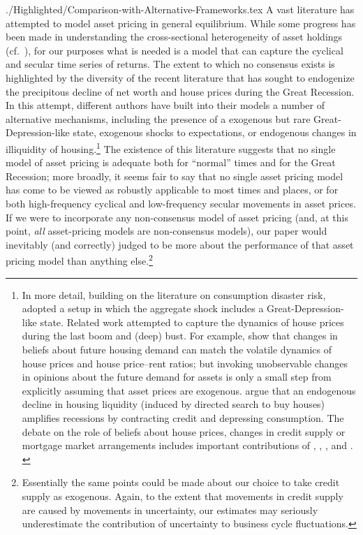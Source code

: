 \documentclass[titlepage]{\econtex}
\begin{document}
\begin{verbatimwrite}{./Highlighted/Comparison-with-Alternative-Frameworks.tex}
A vast literature has attempted to model asset pricing in general equilibrium.  While some progress has been made in understanding the cross-sectional heterogeneity of asset holdings (cf.\ \cite{gmAssetPricing}), for our purposes what is needed is a model that can capture the cyclical and secular time series of returns.  The extent to which no consensus exists is highlighted by the diversity of the recent literature that has sought to endogenize the precipitous decline of net worth and house prices during the Great Recession.  In this attempt, different authors have built into their models a number of alternative mechanisms, including the presence of a exogenous but rare Great-Depression-like state, exogenous shocks to expectations, or endogenous changes in illiquidity of housing.\footnote{In more detail, building on the literature on consumption disaster risk, \cite{glover:intergenRedistr} adopted a setup in which the aggregate shock includes a Great-Depression-like state. Related work attempted to capture the dynamics of house prices during the last boom and (deep) bust. For example, \cite{kmv:houseBoomBust} show that changes in beliefs about future housing demand can match the volatile dynamics of house prices and house price--rent ratios; but invoking unobservable changes in opinions about the future demand for assets is only a small step from explicitly assuming that asset prices are exogenous. \cite{garrigaHedlund} argue that an endogenous decline in housing liquidity (induced by directed search to buy houses) amplifies recessions by contracting credit and depressing consumption.  The debate on the role of beliefs about house prices, changes in credit supply or mortgage market arrangements includes important contributions of \cite{favilukis:housing}, \cite{kmv:houseBoomBust}, \cite{justPrimTamb:CredSupplyAndHouseBoom}, and \cite{garrigaHedlund}. \label{foot_housingLit}}  The existence of this literature suggests that no single model of asset pricing is adequate both for ``normal'' times and for the Great Recession; more broadly, it seems fair to say that no single asset pricing model has come to be viewed as robustly applicable to most times and places, or for both high-frequency cyclical and low-frequency secular movements in asset prices.  If we were to incorporate any non-consensus model of asset pricing (and, at this point, \textit{all} asset-pricing models are non-consensus models), our paper would inevitably (and correctly) judged to be more about the performance of that asset pricing model than anything else.\footnote{Essentially the same points could be made about our choice to take credit supply as exogenous.  Again, to the extent that movements in credit supply are caused by movements in uncertainty, our estimates may seriously underestimate the contribution of uncertainty to business cycle fluctuations.}



\end{verbatimwrite}
\end{document}
